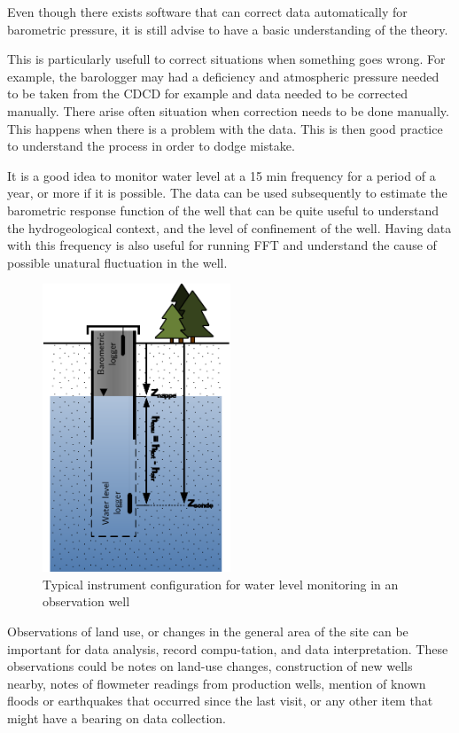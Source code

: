 \documentclass[WHATMANUAL.tex]{subfiles}
\begin{document}
Even though there exists software that can correct data automatically for barometric pressure, it is still advise to have a basic understanding of the theory.

This is particularly usefull to correct situations when something goes wrong. For example, the barologger may had a deficiency and atmospheric pressure needed to be taken from the CDCD for example and data needed to be corrected manually. There arise often situation when correction needs to be done manually. This happens when there is a problem with the data. This is then good practice to understand the process in order to dodge mistake.

It is a good idea to monitor water level at a 15 min frequency for a period of a year, or more if it is possible. The data can be used subsequently to estimate the barometric response function of the well that can be quite useful to understand the hydrogeological context, and the level of confinement of the well. Having data with this frequency is also useful for running FFT and understand the cause of possible unatural fluctuation in the well.

\begin{figure}[!ht]
\centering
\includegraphics[width=0.5\textwidth]{img/ObsWell}
\caption[Typical instrument configuration for water level monitoring in an observation well]{Typical instrument configuration for water level monitoring in an observation well}
\label{fig:obswell_config}
\end{figure}

Observations of land use, or changes in the general area of the site can be important for data analysis, record compu-tation, and data interpretation. These observations could be notes on land-use changes, construction of new wells nearby, notes of flowmeter readings from production wells, mention of known floods or earthquakes that occurred since the last visit, or any other item that might have a bearing on data collection.
\end{document}
